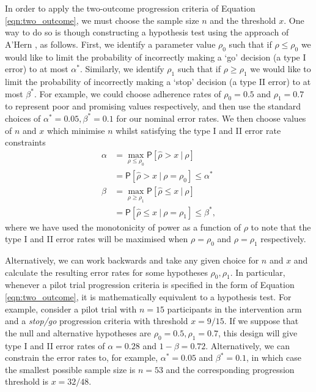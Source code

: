 \documentclass{bmcart}
\newcommand{\PR}{{\mathsf P}}
\begin{document}
In order to apply the two-outcome progression criteria of Equation \ref{eqn:two_outcome}, we must choose the sample size $n$ and the threshold $x$. One way to do so is though constructing a hypothesis test using the approach of A'Hern \cite{AHern2001}, as follows. First, we identify a parameter value $\rho_0$ such that if $\rho \leq \rho_0$ we would like to limit the probability of incorrectly making a `go' decision (a type I error) to at most $\alpha^*$. Similarly, we identify $\rho_1$ such that if $\rho \geq \rho_1$ we would like to limit the probability of incorrectly making a `stop' decision (a type II error) to at most $\beta^*$. For example, we could choose adherence rates of $\rho_0 = 0.5$ and $\rho_1 = 0.7$ to represent poor and promising values respectively, and then use the standard choices of $\alpha^* = 0.05, \beta^* = 0.1$ for our nominal error rates. We then choose values of $n$ and $x$ which minimise $n$ whilst satisfying the type I and II error rate constraints
\begin{align}
\alpha &= \max_{\rho \leq \rho_0} \PR[ \hat{\rho} > x ~ | ~ \rho] \\
&= \PR[ \hat{\rho} > x ~ | ~ \rho = \rho_0] \leq \alpha^* \\
\beta &= \max_{\rho \geq \rho_1} \PR[ \hat{\rho} \leq x ~ | ~ \rho] \\
&= \PR[ \hat{\rho} \leq x ~ | ~ \rho = \rho_1] \leq \beta^*,
\end{align}
where we have used the monotonicity of power as a function of $\rho$ to note that the type I and II error rates will be maximised when $\rho = \rho_0$ and $\rho = \rho_1$ respectively.

Alternatively, we can work backwards and take any given choice for $n$ and $x$ and calculate the resulting error rates for some hypotheses $\rho_0, \rho_1$. In particular, whenever a pilot trial progression criteria is specified in the form of Equation \ref{eqn:two_outcome}, it is mathematically equivalent to a hypothesis test. For example, consider a pilot trial with $n = 15$ participants in the intervention arm and a \emph{stop/go} progression criteria with threshold $x = 9/15$. If we suppose that the null and alternative hypotheses are $\rho_0 = 0.5, \rho_1 = 0.7$, this design will give type I and II error rates of $\alpha = 0.28$ and $1 - \beta = 0.72$. Alternatively, we can constrain the error rates to, for example, $\alpha^* = 0.05$ and $\beta^* = 0.1$, in which case the smallest possible sample size is $n = 53$ and the corresponding progression threshold is $x = 32/48$. 
\end{document}
